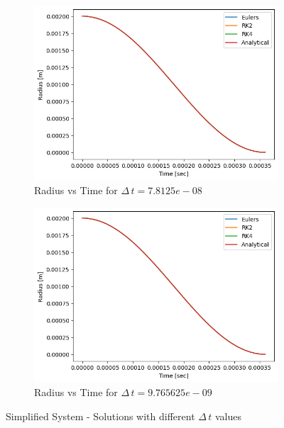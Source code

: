 \documentclass[12pt]{article}
\begin{document}
\begin{figure}[H]
\begin{subfigure}[h]{0.495\textwidth}
        \includegraphics[width=\textwidth]{out/dt_variance/Question_1/dt_7.8125e-08/combined_graph.png}
        \caption{Radius vs Time for $\Delta\,t = 7.8125e-08$}
        \label{fig:part_1_7.8125e-08}
    \end{subfigure}
    \hfill
    \begin{subfigure}[h]{0.495\textwidth}
        \includegraphics[width=\textwidth]{out/dt_variance/Question_1/dt_9.765625e-09/combined_graph.png}
        \caption{Radius vs Time for $\Delta\,t = 9.765625e-09$}
        \label{fig:part_1_9.765625e-09}
    \end{subfigure}
\caption{Simplified System - Solutions with different $\Delta \, t$ values}
\label{fig:part_1_solutions}
\end{figure}
\end{document}
